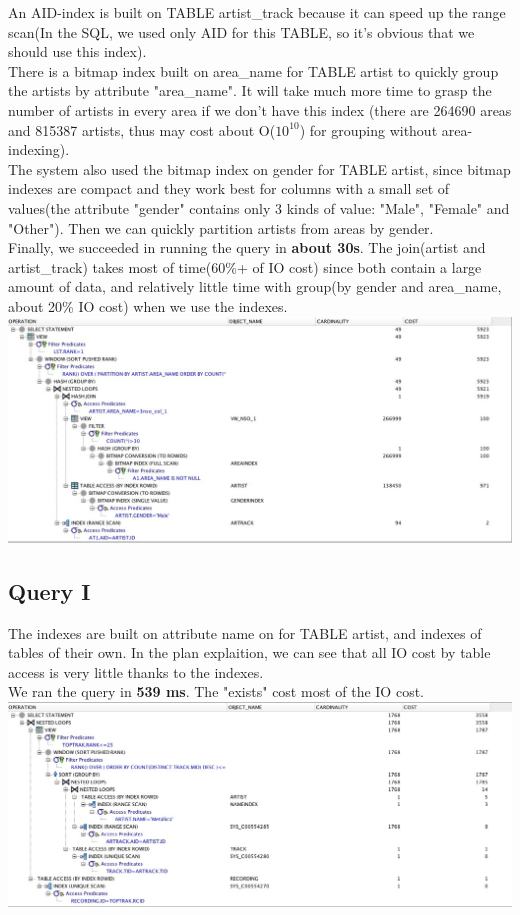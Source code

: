 \documentclass[11pt]{article} %
\begin{document}
{An AID-index is built on TABLE artist\_track because it can speed up the range scan(In the SQL, we used only AID for this TABLE, so it's obvious that we should use this index).\\
There is a bitmap index built on area\_name for TABLE artist to quickly group the artists by attribute "area\_name". It will take much more time to grasp the number of artists in every area if we don't have this index (there are 264690 areas and 815387 artists, thus may cost about O($10^{10}$) for grouping without area-indexing). \\
The system also used the bitmap index on gender for TABLE artist, since bitmap indexes are compact and they work best for columns with a small set of values(the attribute "gender" contains only 3 kinds of value: "Male", "Female" and "Other"). Then we can quickly partition artists from areas by gender. \\
Finally, we succeeded in running the query in \textbf{about 30s}. The join(artist and artist\_track) takes most of time(60\%+ of IO cost) since both contain a large amount of data, and relatively little time with group(by gender and area\_name, about 20\% IO cost) when we use the indexes.\\
\includegraphics[width=14cm]{costh}

\subsection{Query I}
The indexes are built on attribute name on for TABLE artist, and indexes of tables of their own. In the plan explaition, we can see that all IO cost by table access is very little thanks to the indexes.\\
We ran the query in \textbf{539 ms}. The "exists" cost most of the IO cost.\\
\includegraphics[width=14cm]{costi}

}
\end{document}
